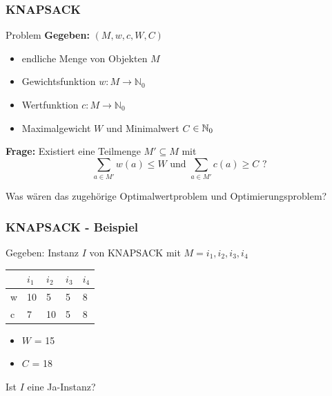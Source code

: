 \begin{frame}
 \frametitle{KNAPSACK}
 
 \begin{block}{Problem}
 \textbf{Gegeben:} $(M, w, c, W, C)$
 \begin{itemize}
  \item endliche Menge von Objekten $M$
  \item Gewichtsfunktion $w:M \rightarrow \mathbb{N}_0$
  \item Wertfunktion $c:M \rightarrow \mathbb{N}_0$
  \item Maximalgewicht $W$ und Minimalwert $C$ $\in \mathbb{N}_0$
 \end{itemize}
 \end{block}
 
\textbf{Frage:} Existiert eine Teilmenge $M' \subseteq M$ mit $$\sum_{a\in M'} w(a) \leq W \text{ und } \sum_{a\in  M'} c(a) \geq C\text{  ?}$$

\pause

Was wären das zugehörige Optimalwertproblem und Optimierungsproblem?
\end{frame}

\begin{frame}
 \frametitle{KNAPSACK - Beispiel}
 Gegeben: Instanz $I$ von KNAPSACK mit $M = {i_1, i_2, i_3, i_4}$
  \begin{center}
\begin{tabular}{l|l|l|l|l}
	  &$i_1$ &$i_2$ &$i_3$ 	&$i_4$\\
  \hline
	w &10	 &5	&5	&8\\
  \hline
	c &7	 &10	&5	&8\\	
\end{tabular}
\end{center}
\begin{itemize}
 \item $W$ = 15
 \item $C$ = 18
\end{itemize}
Ist $I$ eine Ja-Instanz?
\end{frame}

